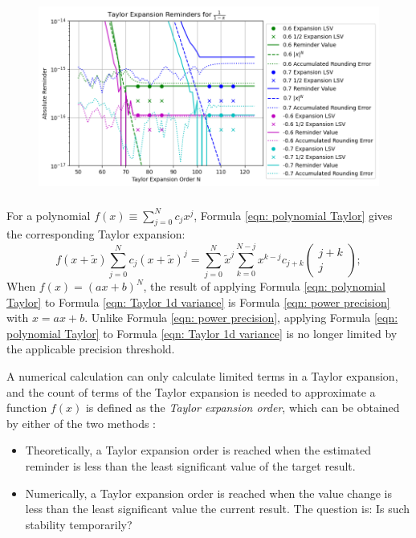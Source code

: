 \documentclass[twoside]{article}
\numberwithin{equation}{section}
\begin{document}
\fi

\begin{figure}
\centering
\includegraphics[height=2.5in]{Taylor_Expansion.png} 
\label{fig: Taylor_Expansion}
\end{figure}


For a polynomial $f(x) \equiv \sum_{j=0}^{N} c_j x^j$, Formula \eqref{eqn: polynomial Taylor} gives the corresponding Taylor expansion:
\begin{equation}
\label{eqn: polynomial Taylor}
f(x + \tilde{x}) \sum_{j=0}^{N} c_j (x + \tilde{x})^j = \sum_{j=0}^{N} \tilde{x}^{j} \sum_{k=0}^{N-j} x^{k - j} c_{j + k} \begin{pmatrix} j + k \\ j \end{pmatrix};
\end{equation}
When $f(x) = (ax + b)^N$, the result of applying Formula \eqref{eqn: polynomial Taylor} to Formula \eqref{eqn: Taylor 1d variance} is Formula \eqref{eqn: power precision} with $x = ax + b$. 
Unlike Formula \eqref{eqn: power precision}, applying Formula \eqref{eqn: polynomial Taylor} to Formula \eqref{eqn: Taylor 1d variance} is no longer limited by the applicable precision threshold.

A numerical calculation can only calculate limited terms in a Taylor expansion, and the count of terms of the Taylor expansion is needed to approximate a function $f(x)$ is defined as the \emph{Taylor expansion order}, which can be obtained by either of the two methods \cite{Numerical_Recipes}:
\begin{itemize}
\item Theoretically, a Taylor expansion order is reached when the estimated reminder is less than the least significant value of the target result.

\item Numerically, a Taylor expansion order is reached when the value change is less than the least significant value the current result.
The question is: Is such stability temporarily?
\end{itemize}
\end{document}
